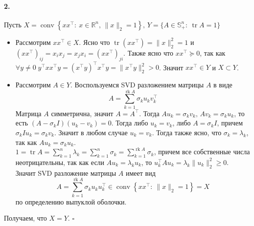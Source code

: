 \documentclass{article}
\DeclareMathOperator{\tr}{tr}
\DeclareMathOperator{\rk}{rk}
\newcommand*{\QED}{\null\nobreak\hfill\ensuremath{\square}}%
\newcommand*{\R}{\mathbb{R}}
\begin{document}
\paragraph{2.}  Пусть $ X = \operatorname{conv}\left\{xx^{\top} :\: x \in \R^n,\, \| x \|_2 = 1 \right\},\, Y = \{ A \in \mathbb{S}^n_+ :\: \tr A = 1 \} $
\begin{itemize}
    \item Рассмотрим $ x x^{\top} \in X $. Ясно что $ \tr(x x^{\top}) = \| x \|_2^2 = 1 $ и $ (x x^{\top})_{ij} = x_i x_j = x_j x_i = (x x^{\top})_{ji} $. Также ясно что $ x x^{\top} \succeq 0 $, так как $ \forall y \neq 0 \; y^{\top} x x^{\top} y = (x^{\top} y)^{\top} x^{\top} y = \| x^{\top} y \|_2^2 > 0 $. Значит $ x x^{\top} \in Y $ и $ X \subset Y $.
    \item Рассмотрим $ A \in Y $. Воспользуемся SVD разложением матрицы $A$ в виде
        \[ A = \sum\limits_{k = 1}^{\rk A} \sigma_k u_k v_k^{\top} \]
        Матрица $A$ симметрична, значит $ A = A^{\top}$. Тогда $A u_k = \sigma_k v_k,\, A v_k = \sigma_k u_k $, то есть $ (A - \sigma_k I)(u_k - v_k) = 0 $. Тогда либо $u_k = v_k$, либо $A = \sigma_k I$, причем $\sigma_k I u_k = \sigma_k v_k$. Значит в любом случае $u_k = v_k$. Тогда также ясно, что $\sigma_k = \lambda_k$, так как $ A u_k = \sigma_k u_k $. \\
        $ 1 = \tr A = \sum\limits_{k = 1}^n \lambda_k = \sum\limits_{k = 1}^n \sigma_k = \sum\limits_{k = 1}^{\rk A} \sigma_k $, причем все собственные числа неотрицательны, так как если $A u_k = \lambda_k u_k$, то $ u_k^{\top} A u_k = \lambda_k \| u_k \|_2^2 \geqslant 0 $. Значит SVD разложение матрицы $A$ имеет вид
        \[ A = \sum\limits_{k = 1}^{\rk A} \sigma_k u_k u_k^{\top} \in \operatorname{conv} \left\{ x x^{\top} :\: \| x \|_2 = 1 \right\} = X \]
        по определению выпуклой оболочки.
\end{itemize}
Получаем, что $ X = Y $. \QED 
\end{document}
